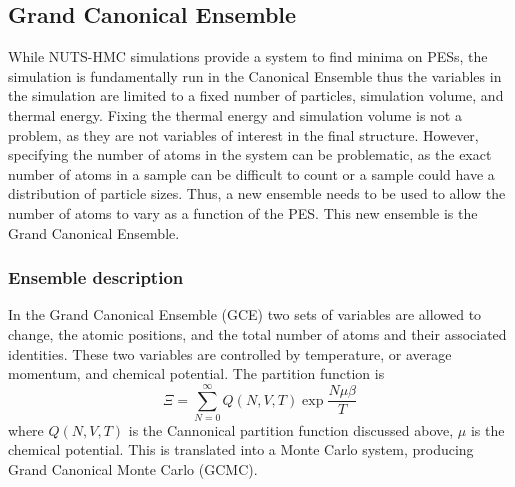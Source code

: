 \subsection{Grand Canonical Ensemble}
While NUTS-HMC simulations provide a system to find minima on PESs, the simulation is fundamentally run in the Canonical Ensemble thus the variables in the simulation are limited to a fixed number of particles, simulation volume, and thermal energy.
Fixing the thermal energy and simulation volume is not a problem, as they are not variables of interest in the final structure.
However, specifying the number of atoms in the system can be problematic, as the exact number of atoms in a sample can be difficult to count or a sample could have a distribution of particle sizes.
Thus, a new ensemble needs to be used to allow the number of atoms to vary as a function of the PES.
This new ensemble is the Grand Canonical Ensemble.

\subsubsection{Ensemble description}
In the Grand Canonical Ensemble (GCE) two sets of variables are allowed to change, the atomic positions, and the total number of atoms and their associated identities.
These two variables are controlled by temperature, or average momentum, and chemical potential.
The partition function is
\begin{equation}
  \Xi = \sum_{N=0}^{\infty} Q(N, V, T) \exp{\frac{N\mu\beta}{T}}
\end{equation}
where $Q(N, V, T)$ is the Cannonical partition function discussed above, $\mu$ is the chemical potential. \cite{McQuarrie}
This is translated into a Monte Carlo system, producing Grand Canonical Monte Carlo (GCMC).
